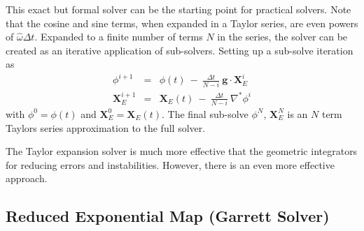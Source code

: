 \documentclass{article}
\def\gvec{\textbf{g}}
\def\Xvec{\textbf{X}}
\def\what{{\hat{\omega}}}
\def\dt{\Delta t}
\def\inabla{\nabla^{*}}
\begin{document}
This exact but formal solver can be the starting point for practical solvers.  Note that the cosine and sine terms, when expanded in a Taylor series, are even powers of $\what\dt$.  Expanded to a finite number of terms $N$ in the series, the solver can be created as an iterative application of sub-solvers. Setting up a sub-solve iteration as
\begin{eqnarray}
\phi^{i+1} &=& \phi(t) \ -\ \frac{\dt}{N-i}\ \gvec\cdot\Xvec_E^i \\
\Xvec_E^{i+1} &=& \Xvec_E(t) \ -\ \frac{\dt}{N-i}\ \inabla\phi^i
\end{eqnarray}
with $\phi^0 = \phi(t)$ and $\Xvec_E^0 = \Xvec_E(t)$.  The final sub-solve $\phi^N$, $\Xvec_E^N$ is an $N$ term Taylors series approximation to the full solver.

The Taylor expansion solver is much more effective that the geometric integrators for reducing errors and instabilities. However, there is an even more effective approach.

\subsection{Reduced Exponential Map (Garrett Solver)}
\end{document}
